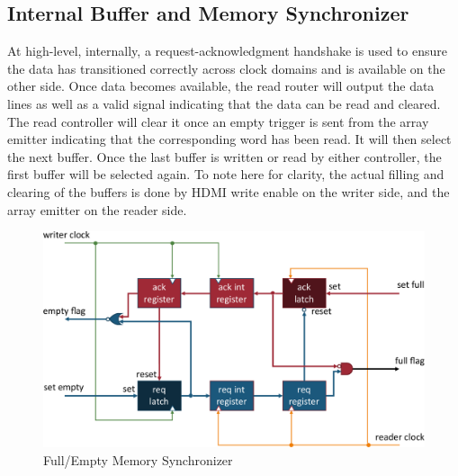     \subsection{Internal Buffer and Memory Synchronizer}
        \label{Sec:MemorySync}
        At high-level, internally, a request-acknowledgment handshake is used to ensure the data has transitioned correctly across clock domains and is available on the other side. Once data becomes available, the read router will output the data lines as well as a valid signal indicating that the data can be read and cleared. The read controller will clear it once an empty trigger is sent from the array emitter indicating that the corresponding word has been read. It will then select the next buffer. Once the last buffer is written or read by either controller, the first buffer will be selected again. To note here for clarity, the actual filling and clearing of the buffers is done by HDMI write enable on the writer side, and the array emitter on the reader side.

        \begin{figure}
            \centering
            \includegraphics[width=1.0\textwidth]{fig/full_empty_circuit.pdf}
            \caption{Full/Empty Memory Synchronizer}
            \label{fig:full_empty_circuit}
        \end{figure}

